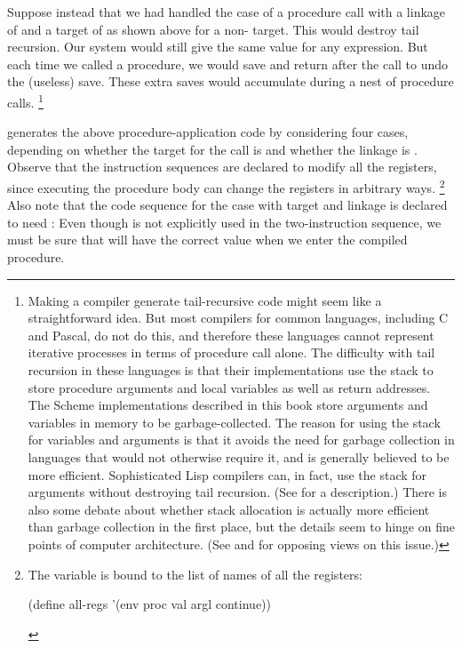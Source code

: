 Suppose instead that we had handled the case of a procedure call with a linkage of  and a target of  as shown above for a non- target.
This would destroy tail recursion.
Our system would still give the same value for any expression.
But each time we called a procedure, we would save  and return after the call to undo the (useless) save.
These extra saves would accumulate during a nest of procedure calls.%
\footnote{
	Making a compiler generate tail-recursive code might seem like a straightforward idea.
	But most compilers for common languages, including C and Pascal, do not do this, and therefore these languages cannot represent iterative processes in terms of procedure call alone.
	The difficulty with tail recursion in these languages is that their implementations use the stack to store procedure arguments and local variables as well as return addresses.
	The Scheme implementations described in this book store arguments and variables in memory to be garbage-collected.
	The reason for using the stack for variables and arguments is that it avoids the need for garbage collection in languages that would not otherwise require it, and is generally believed to be more efficient.
	Sophisticated Lisp compilers can, in fact, use the stack for arguments without destroying tail recursion.
	(See  for a description.)
	There is also some debate about whether stack allocation is actually more efficient than garbage collection in the first place, but the details seem to hinge on fine points of computer architecture.
	(See  and  for opposing views on this issue.)
}

 generates the above procedure-application code by considering four cases, depending on whether the target for the call is  and whether the linkage is .
Observe that the instruction sequences are declared to modify all the registers, since executing the procedure body can change the registers in arbitrary ways.%
\footnote{
	The variable  is bound to the list of names of all the registers:
	\begin{smallscheme}
	  (define all-regs '(env proc val argl continue))
	\end{smallscheme}
}
Also note that the code sequence for the case with target  and linkage  is declared to need :
Even though  is not explicitly used in the two-instruction sequence, we must be sure that  will have the correct value when we enter the compiled procedure.

